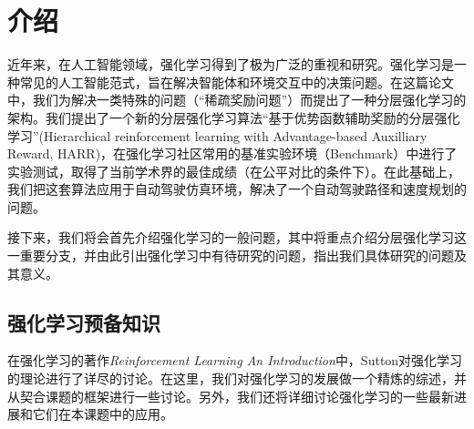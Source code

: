 \chapter{介绍}
近年来，在人工智能领域，强化学习得到了极为广泛的重视和研究。强化学习是一种常见的人工智能范式，旨在解决智能体和环境交互中的决策问题。在这篇论文中，我们为解决一类特殊的问题（``稀疏奖励问题''）而提出了一种分层强化学习的架构。我们提出了一个新的分层强化学习算法``基于优势函数辅助奖励的分层强化学习''(Hierarchical reinforcement learning with Advantage-based Auxilliary Reward, HARR)，在强化学习社区常用的基准实验环境（Benchmark\cite{benchmarking_RL}）中进行了实验测试，取得了当前学术界的最佳成绩（在公平对比的条件下）。在此基础上，我们把这套算法应用于自动驾驶仿真环境，解决了一个自动驾驶路径和速度规划的问题。

接下来，我们将会首先介绍强化学习的一般问题，其中将重点介绍分层强化学习这一重要分支，并由此引出强化学习中有待研究的问题，指出我们具体研究的问题及其意义。

\section{强化学习预备知识}
  在强化学习的著作\textit{Reinforcement Learning An Introduction}\cite{Sutton_book}中，Sutton对强化学习的理论进行了详尽的讨论。在这里，我们对强化学习的发展做一个精炼的综述，并从契合课题的框架进行一些讨论。另外，我们还将详细讨论强化学习的一些最新进展和它们在本课题中的应用。
